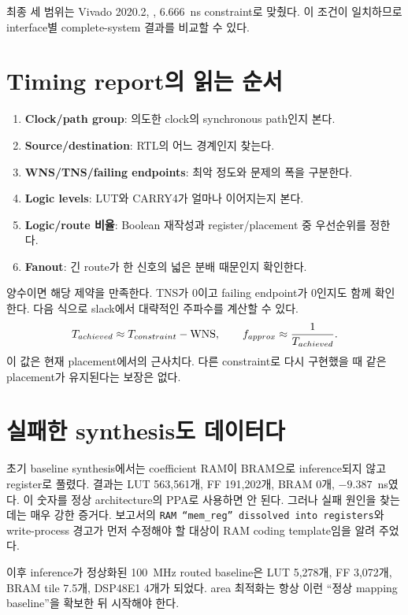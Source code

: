 최종 세 범위는 Vivado 2020.2, , 6.666~ns
constraint로 맞췄다. 이 조건이 일치하므로 interface별 complete-system 결과를
비교할 수 있다.

\section{Timing report의 읽는 순서}

\begin{enumerate}
  \item \textbf{Clock/path group}: 의도한 clock의 synchronous path인지 본다.
  \item \textbf{Source/destination}: RTL의 어느 경계인지 찾는다.
  \item \textbf{WNS/TNS/failing endpoints}: 최악 정도와 문제의 폭을 구분한다.
  \item \textbf{Logic levels}: LUT와 CARRY4가 얼마나 이어지는지 본다.
  \item \textbf{Logic/route 비율}: Boolean 재작성과 register/placement 중 우선순위를 정한다.
  \item \textbf{Fanout}: 긴 route가 한 신호의 넓은 분배 때문인지 확인한다.
\end{enumerate}

 양수이면 해당 제약을 만족한다. TNS가 0이고 failing endpoint가 0인지도
함께 확인한다. 다음 식으로 slack에서 대략적인 주파수를 계산할 수 있다.
\[
T_{achieved}\approx T_{constraint}-\mathrm{WNS},\qquad
f_{approx}\approx \frac{1}{T_{achieved}}.
\]
이 값은 현재 placement에서의 근사치다. 다른 constraint로 다시 구현했을 때
같은 placement가 유지된다는 보장은 없다.

\section{실패한 synthesis도 데이터다}

초기 baseline synthesis에서는 coefficient RAM이 BRAM으로 inference되지 않고
register로 풀렸다. 결과는 LUT 563,561개, FF 191,202개, BRAM 0개, \wns
$-9.387$~ns였다. 이 숫자를 정상 architecture의 PPA로 사용하면 안 된다.
그러나 실패 원인을 찾는 데는 매우 강한 증거다. 보고서의
\texttt{RAM ``mem\_reg'' dissolved into registers}와 write-process 경고가 먼저
수정해야 할 대상이 RAM coding template임을 알려 주었다.

이후 inference가 정상화된 100~MHz routed baseline은 LUT 5,278개, FF 3,072개,
BRAM tile 7.5개, DSP48E1 4개가 되었다. area 최적화는 항상 이런 ``정상 mapping
baseline''을 확보한 뒤 시작해야 한다.

